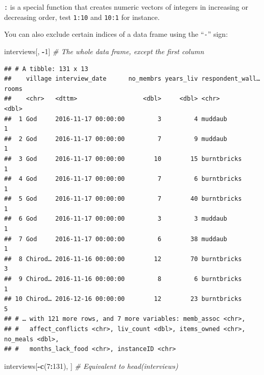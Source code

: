 \documentclass[]{book}
\newenvironment{Shaded}{\begin{snugshade}}{\end{snugshade}}
\newcommand{\KeywordTok}[1]{\textcolor[rgb]{0.13,0.29,0.53}{\textbf{#1}}}
\newcommand{\DecValTok}[1]{\textcolor[rgb]{0.00,0.00,0.81}{#1}}
\newcommand{\CommentTok}[1]{\textcolor[rgb]{0.56,0.35,0.01}{\textit{#1}}}
\newcommand{\OperatorTok}[1]{\textcolor[rgb]{0.81,0.36,0.00}{\textbf{#1}}}
\newcommand{\NormalTok}[1]{#1}
\begin{document}
\texttt{:} is a special function that creates numeric vectors of
integers in increasing or decreasing order, test \texttt{1:10} and
\texttt{10:1} for instance.

You can also exclude certain indices of a data frame using the
``\texttt{-}'' sign:

\begin{Shaded}
\begin{Highlighting}[]
\NormalTok{interviews[, }\OperatorTok{-}\DecValTok{1}\NormalTok{]          }\CommentTok{# The whole data frame, except the first column}
\end{Highlighting}
\end{Shaded}

\begin{verbatim}
## # A tibble: 131 x 13
##    village interview_date      no_membrs years_liv respondent_wall… rooms
##    <chr>   <dttm>                  <dbl>     <dbl> <chr>            <dbl>
##  1 God     2016-11-17 00:00:00         3         4 muddaub              1
##  2 God     2016-11-17 00:00:00         7         9 muddaub              1
##  3 God     2016-11-17 00:00:00        10        15 burntbricks          1
##  4 God     2016-11-17 00:00:00         7         6 burntbricks          1
##  5 God     2016-11-17 00:00:00         7        40 burntbricks          1
##  6 God     2016-11-17 00:00:00         3         3 muddaub              1
##  7 God     2016-11-17 00:00:00         6        38 muddaub              1
##  8 Chirod… 2016-11-16 00:00:00        12        70 burntbricks          3
##  9 Chirod… 2016-11-16 00:00:00         8         6 burntbricks          1
## 10 Chirod… 2016-12-16 00:00:00        12        23 burntbricks          5
## # … with 121 more rows, and 7 more variables: memb_assoc <chr>,
## #   affect_conflicts <chr>, liv_count <dbl>, items_owned <chr>, no_meals <dbl>,
## #   months_lack_food <chr>, instanceID <chr>
\end{verbatim}

\begin{Shaded}
\begin{Highlighting}[]
\NormalTok{interviews[}\OperatorTok{-}\KeywordTok{c}\NormalTok{(}\DecValTok{7}\OperatorTok{:}\DecValTok{131}\NormalTok{), ]   }\CommentTok{# Equivalent to head(interviews)}
\end{Highlighting}
\end{Shaded}
\end{document}
